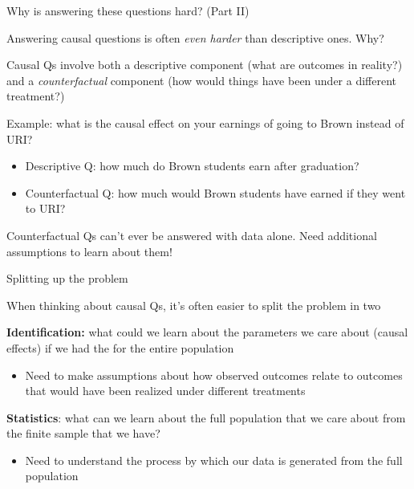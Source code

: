 \documentclass[11pt,english,handout]{beamer}
\newenvironment{wideitemize}{\itemize\addtolength{\itemsep}{10pt}}{\enditemize}
\begin{document}
\begin{frame}{Why is answering these questions hard? (Part II)}
\begin{wideitemize}
	\item
	Answering causal questions is often \textit{even harder} than descriptive ones. Why?
	
	\pause
	\item
	Causal Qs involve both a descriptive component (what are outcomes in reality?) and a \textit{counterfactual} component (how would things have been under a different treatment?)
	
	\pause
	\item
	Example: what is the causal effect on your earnings of going to Brown instead of URI? 
		\begin{itemize}
			\item
			Descriptive Q: how much do Brown students earn after graduation? 
			
			\item
			Counterfactual Q: how much would Brown students have earned if they went to URI?  
		\end{itemize}
		
	\pause 	
	\item Counterfactual Qs can't ever be answered with data alone. Need additional assumptions to learn about them!	
\end{wideitemize}	
\end{frame}



\begin{frame}{Splitting up the problem}
	\begin{wideitemize}
		
		\item
		When thinking about causal Qs, it's often easier to split the problem in two
		
		\item
		\textbf{Identification:} what could we learn about the parameters we care about (causal effects) if we had the  for the entire population
		\begin{itemize}
			\item 
			Need to make assumptions about how observed outcomes relate to outcomes that would have been realized under different treatments
		\end{itemize}
		
		\item
		\textbf{Statistics}: what can we learn about the full population that we care about from the finite sample that we have?
			\begin{itemize}
				\item 
				Need to understand the process by which our data is generated from the full population
			\end{itemize} 	
		
	\end{wideitemize}	
	
\end{frame}
\end{document}

